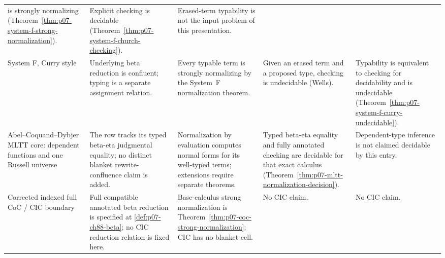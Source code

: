 \begin{landscape}
\begin{longtable}{@{}p{.95in}p{1.30in}p{1.45in}p{1.55in}p{1.55in}@{}}
is strongly normalizing
(Theorem~\ref{thm:p07-system-f-strong-normalization}). & Explicit checking is
decidable (Theorem~\ref{thm:p07-system-f-church-checking}). & Erased-term
typability is not the input problem of this presentation. \\
System F, Curry style & Underlying beta reduction is confluent; typing is a
separate assignment relation. & Every typable term is strongly normalizing by
the System~F normalization theorem. & Given an erased term and a proposed
type, checking is undecidable (Wells). & Typability is equivalent to checking
for decidability and is undecidable
(Theorem~\ref{thm:p07-system-f-curry-undecidable}). \\
Abel--Coquand--Dybjer MLTT core: dependent functions and one Russell universe &
The row tracks its typed beta-eta judgmental equality; no distinct blanket
rewrite-confluence claim is added. & Normalization by evaluation computes
normal forms for its well-typed terms; extensions require separate theorems. &
Typed beta-eta equality and fully annotated checking are decidable for that
exact calculus
(Theorem~\ref{thm:p07-mltt-normalization-decision}). & Dependent-type
inference is not claimed decidable by this entry. \\
Corrected indexed full CoC / CIC boundary & Full compatible annotated
beta reduction is specified at \cref{def:p07-ch88-beta}; no CIC reduction
relation is fixed here. & Base-calculus strong normalization is
Theorem~\ref{thm:p07-coc-strong-normalization}; CIC has no blanket cell. & No
CIC claim. & No CIC claim. \\
\bottomrule
\end{longtable}
\endgroup
\end{landscape}
